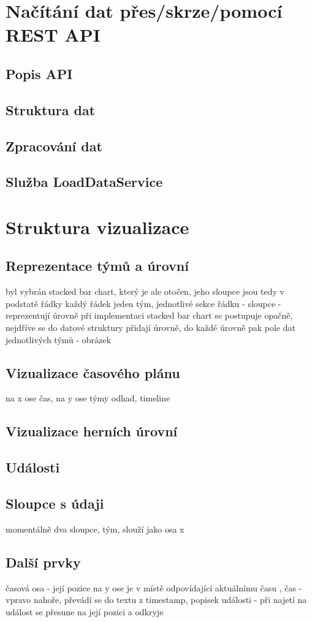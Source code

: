 \documentclass[
  digital, %
  oneside, %
  table,   %
  nolof,     %
  nolot,     %
]{fithesis3}
\begin{document}
\section{Načítání dat přes/skrze/pomocí REST API}
\subsection{Popis API}
\subsection{Struktura dat}
\subsection{Zpracování dat}
\subsection{Služba LoadDataService}

\section{Struktura vizualizace}
\subsection{Reprezentace týmů a úrovní}
byl vybrán stacked bar chart, který je ale otočen, jeho sloupce jsou tedy v podstatě řádky
každý řádek jeden tým, jednotlivé sekce řádku - sloupce - reprezentují úrovně
při implementaci stacked bar chart se postupuje opačně, nejdříve se do datové struktury přidají úrovně, do každé úrovně pak pole dat jednotlivých týmů - obrázek
\subsection{Vizualizace časového plánu}
na x ose čas, na y ose týmy
odhad, timeline
\subsection{Vizualizace herních úrovní}
\subsection{Události}
\subsection{Sloupce s údaji}
momentálně dva sloupce, tým, slouží jako osa x
\subsection{Další prvky}
časová osa - její pozice na y ose je v místě odpovídající aktuálnímu času , čas - vpravo nahoře, převádí se do textu z timestamp, popisek události - při najetí na událost se přesune na její pozici a odkryje
\end{document}
